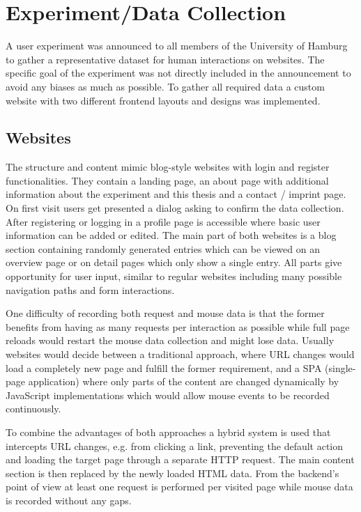 \documentclass[
    fontsize=12pt,
    headings=small,
    parskip=half,           %
    bibliography=totoc,
    numbers=noenddot,       %
    open=any,               %
    final,                   %
    table
]{scrreprt}
\begin{document}
\section{Experiment/Data Collection}

A user experiment was announced to all members of the University of Hamburg to gather a representative dataset for human interactions on websites. The specific goal of the experiment was not directly included in the announcement to avoid any biases as much as possible. To gather all required data a custom website with two different frontend layouts and designs was implemented.

\label{concept_websites}
\subsection{Websites}

The structure and content mimic blog-style websites with login and register functionalities. They contain a landing page, an about page with additional information about the experiment and this thesis and a contact / imprint page. On first visit users get presented a dialog asking to confirm the data collection. After registering or logging in a profile page is accessible where basic user information can be added or edited. The main part of both websites is a blog section containing randomly generated entries which can be viewed on an overview page or on detail pages which only show a single entry.
All parts give opportunity for user input, similar to regular websites including many possible navigation paths and form interactions.

One difficulty of recording both request and mouse data is that the former benefits from having as many requests per interaction as possible while full page reloads would restart the mouse data collection and might lose data. Usually websites would decide between a traditional approach, where URL changes would load a completely new page and fulfill the former requirement, and a SPA (single-page application) where only parts of the content are changed dynamically by JavaScript implementations which would allow mouse events to be recorded continuously.

To combine the advantages of both approaches a hybrid system is used that intercepts URL changes, e.g. from clicking a link, preventing the default action and loading the target page through a separate HTTP request. The main content section is then replaced by the newly loaded HTML data. From the backend's point of view at least one request is performed per visited page while mouse data is recorded without any gaps.
\end{document}
